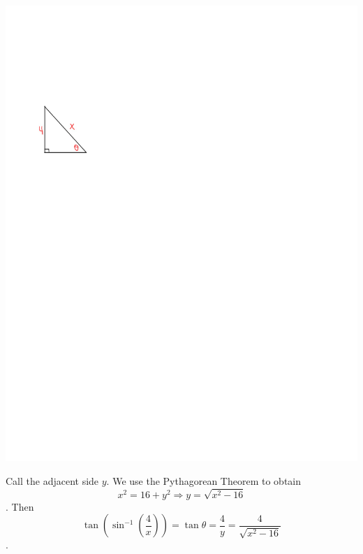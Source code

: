 \documentclass[handout,nooutcomes]{ximera}
\begin{document}
\begin{problem}
\begin{enumerate}
\begin{freeResponse}
			 \begin{image}
			 \includegraphics[trim=60 525 300 170]{Figure5.pdf}
			 \end{image}
			 Call the adjacent side $y$.  We use the Pythagorean Theorem to obtain
			$$x^2 = 16 + y^2 \Longrightarrow y = \sqrt{x^2 - 16}$$.
			Then
			$$ \tan \left( \sin^{-1} \left( \frac{4}{x} \right) \right) = \tan \theta = \frac{4}{y} = \frac{4}{\sqrt{x^2 - 16}}  $$.
			 \end{freeResponse}
			
			\end{enumerate}
			
\end{problem}
			
			
			

	










								
				
				
	
\end{document}
